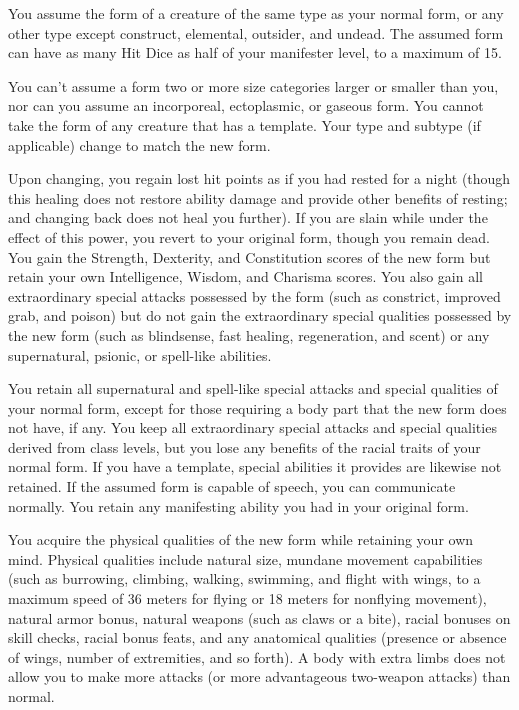 {
	You assume the form of a creature of the same type as your normal form, or any other type except construct, elemental, outsider, and undead. The assumed form can have as many Hit Dice as half of your manifester level, to a maximum of 15.

	You can't assume a form two or more size categories larger or smaller than you, nor can you assume an incorporeal, ectoplasmic, or gaseous form. You cannot take the form of any creature that has a template. Your type and subtype (if applicable) change to match the new form.

	Upon changing, you regain lost hit points as if you had rested for a night (though this healing does not restore ability damage and provide other benefits of resting; and changing back does not heal you further). If you are slain while under the effect of this power, you revert to your original form, though you remain dead. You gain the Strength, Dexterity, and Constitution scores of the new form but retain your own Intelligence, Wisdom, and Charisma scores. You also gain all extraordinary special attacks possessed by the form (such as constrict, improved grab, and poison) but do not gain the extraordinary special qualities possessed by the new form (such as blindsense, fast healing, regeneration, and scent) or any supernatural, psionic, or spell-like abilities.

	You retain all supernatural and spell-like special attacks and special qualities of your normal form, except for those requiring a body part that the new form does not have, if any. You keep all extraordinary special attacks and special qualities derived from class levels, but you lose any benefits of the racial traits of your normal form. If you have a template, special abilities it provides are likewise not retained. If the assumed form is capable of speech, you can communicate normally. You retain any manifesting ability you had in your original form.

	You acquire the physical qualities of the new form while retaining your own mind. Physical qualities include natural size, mundane movement capabilities (such as burrowing, climbing, walking, swimming, and flight with wings, to a maximum speed of 36 meters for flying or 18 meters for nonflying movement), natural armor bonus, natural weapons (such as claws or a bite), racial bonuses on skill checks, racial bonus feats, and any anatomical qualities (presence or absence of wings, number of extremities, and so forth). A body with extra limbs does not allow you to make more attacks (or more advantageous two-weapon attacks) than normal.

}
